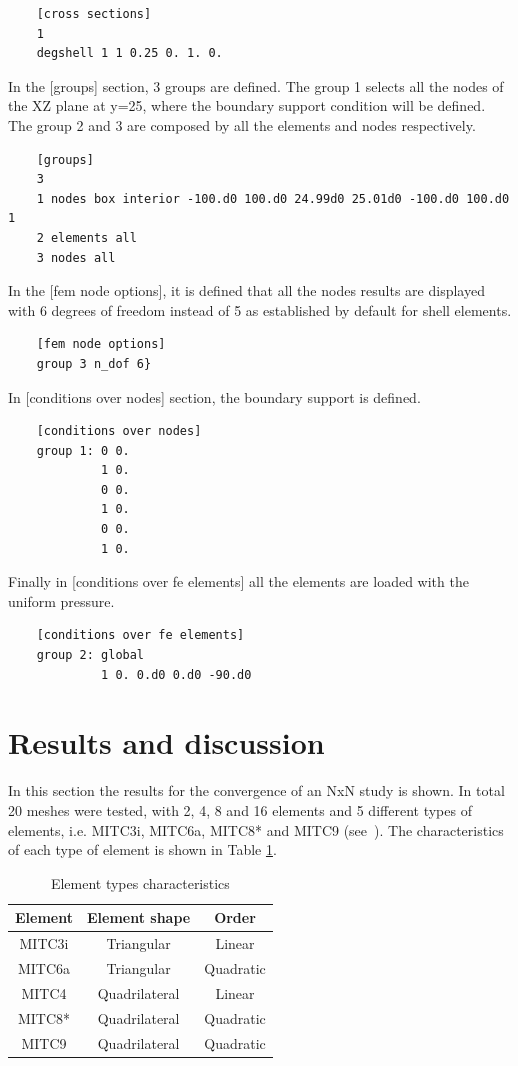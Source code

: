 \documentclass[11pt]{article}
\begin{document}
	\begin{verbatim}
	[cross sections]
	1
	degshell 1 1 0.25 0. 1. 0.
	\end{verbatim}
		
	In the [groups] section, 3 groups are defined. The group 1 selects all the nodes of the XZ plane at y=25, where the boundary support condition will be defined. The group 2 and 3 are composed by all the elements and nodes respectively.
	
	\begin{verbatim}
	[groups]
	3
	1 nodes box interior -100.d0 100.d0 24.99d0 25.01d0 -100.d0 100.d0 1
	2 elements all
	3 nodes all
	\end{verbatim}
	
	In the [fem node options], it is defined that all the nodes results are displayed with 6 degrees of freedom instead of 5 as established by default for shell elements.	
	
	\begin{verbatim}
	[fem node options]
	group 3 n_dof 6}
	\end{verbatim}
	In [conditions over nodes] section, the boundary support is defined.
	\begin{verbatim}
	[conditions over nodes]
	group 1: 0 0.
	         1 0.
	         0 0.
	         1 0.
	         0 0.
	         1 0.
	\end{verbatim}
	
	Finally in [conditions over fe elements] all the elements are loaded with the uniform pressure.
	\begin{verbatim}
	[conditions over fe elements]
	group 2: global
	         1 0. 0.d0 0.d0 -90.d0
	\end{verbatim}
	\section*{Results and discussion}
	
	In this section the results for the convergence of an NxN study is shown. In total 20 meshes were tested, with 2, 4, 8 and 16 elements and 5 different types of elements, i.e. MITC3i, MITC6a, MITC8* and MITC9 (see~\cite{Bathe2006}). The characteristics of each type of element is shown in Table \ref{MITC_tab}.
	
	\begin{table}[H]
	\caption{Element types characteristics}
	\label{MITC_tab}
	\centering
	\begin{tabular}{|c|c|c|}
		\hline
		\textbf{Element} & \textbf{Element shape} & \textbf{Order} \\
		\hline
		MITC3i & Triangular & Linear \\
		\hline
		MITC6a & Triangular & Quadratic \\
		\hline
		MITC4 & Quadrilateral & Linear \\
		\hline
		MITC8* & Quadrilateral & Quadratic \\
		\hline
		MITC9 & Quadrilateral & Quadratic \\
		\hline
	\end{tabular}
\end{table}
	
\end{document}
